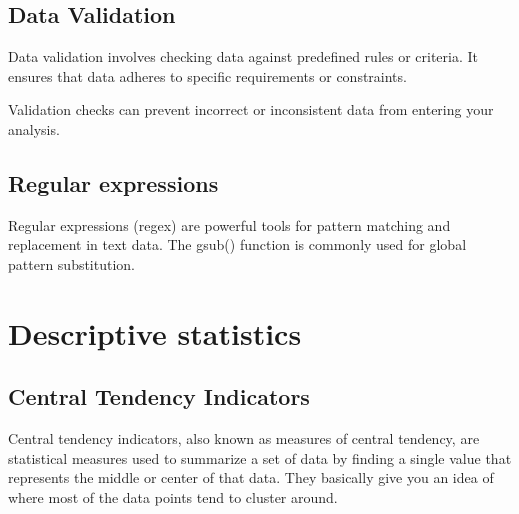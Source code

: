 \documentclass[
]{book}
\newenvironment{Shaded}{\begin{snugshade}}{\end{snugshade}}
\newcommand{\FunctionTok}[1]{\textcolor[rgb]{0.13,0.29,0.53}{\textbf{#1}}}
\newcommand{\NormalTok}[1]{#1}
\newcommand{\OtherTok}[1]{\textcolor[rgb]{0.56,0.35,0.01}{#1}}
\newcommand{\SpecialCharTok}[1]{\textcolor[rgb]{0.81,0.36,0.00}{\textbf{#1}}}
\newcommand{\StringTok}[1]{\textcolor[rgb]{0.31,0.60,0.02}{#1}}
\begin{document}
\hypertarget{data-validation}{%
\section{Data Validation}\label{data-validation}}

Data validation involves checking data against predefined rules or criteria. It ensures that data adheres to specific requirements or constraints.

Validation checks can prevent incorrect or inconsistent data from entering your analysis.

\hypertarget{regular-expressions}{%
\section{Regular expressions}\label{regular-expressions}}

Regular expressions (regex) are powerful tools for pattern matching and replacement in text data. The gsub() function is commonly used for global pattern substitution.

\begin{Shaded}
\end{Shaded}

\hypertarget{descriptive-statistics}{%
\chapter{Descriptive statistics}\label{descriptive-statistics}}

\hypertarget{central-tendency-indicators}{%
\section{Central Tendency Indicators}\label{central-tendency-indicators}}

Central tendency indicators, also known as measures of central tendency, are statistical measures used to summarize a set of data by finding a single value that represents the middle or center of that data. They basically give you an idea of where most of the data points tend to cluster around.
\end{document}
